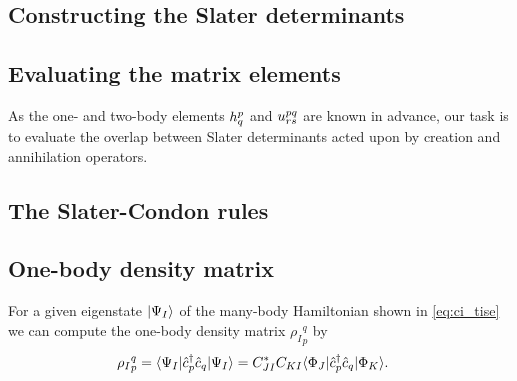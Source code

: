         \subsection{Constructing the Slater determinants}

        \subsection{Evaluating the matrix elements}
            As the one- and two-body elements $h^{p}_{q}$ and
            $u^{pq}_{rs}$ are known in advance, our task is to evaluate
            the overlap between Slater determinants acted upon by creation and
            annihilation operators.

        \subsection{The Slater-Condon rules}

        \subsection{One-body density matrix}
            For a given eigenstate $| \Psi_I \rangle$ of the many-body Hamiltonian
            shown in \autoref{eq:ci_tise} we can compute the one-body density
            matrix ${\rho_I}^{q}_{p}$ by
            \begin{align}
                {\rho_I}^{q}_{p}
                &= \langle \Psi_I |\hat{c}_{p}^{\dagger}\hat{c}_{q}| \Psi_I \rangle
                = C_{JI}^{*}C_{KI}\langle \Phi_J |\hat{c}_{p}^{\dagger}\hat{c}_{q}| \Phi_K \rangle.
            \end{align}

